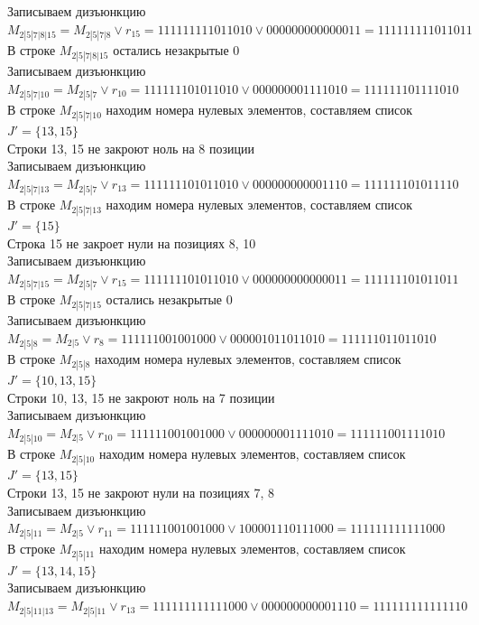 \documentclass[12pt,a4paper]{report}
\begin{document}
Записываем дизъюнкцию $M_{2 | 5 | 7 | 8 | 15} = M_{2 | 5 | 7 | 8}\vee r_{15} = 111111111011010 \vee 000000000000011 = 111111111011011$ \\
В строке $M_{2 | 5 | 7 | 8 | 15}$ остались незакрытые $0$ \\
Записываем дизъюнкцию $M_{2 | 5 | 7 | 10} = M_{2 | 5 | 7}\vee r_{10} = 111111101011010 \vee 000000001111010 = 111111101111010$ \\
В строке $M_{2 | 5 | 7 | 10}$ находим номера нулевых элементов, составляем список $J' = \{13, 15\}$ \\
Строки 13, 15 не закроют ноль на 8 позиции \\
Записываем дизъюнкцию $M_{2 | 5 | 7 | 13} = M_{2 | 5 | 7}\vee r_{13} = 111111101011010 \vee 000000000001110 = 111111101011110$ \\
В строке $M_{2 | 5 | 7 | 13}$ находим номера нулевых элементов, составляем список $J' = \{15\}$ \\
Строка 15 не закроет нули на позициях 8, 10 \\
Записываем дизъюнкцию $M_{2 | 5 | 7 | 15} = M_{2 | 5 | 7}\vee r_{15} = 111111101011010 \vee 000000000000011 = 111111101011011$ \\
В строке $M_{2 | 5 | 7 | 15}$ остались незакрытые $0$ \\
Записываем дизъюнкцию $M_{2 | 5 | 8} = M_{2 | 5}\vee r_{8} = 111111001001000 \vee 000001011011010 = 111111011011010$ \\
В строке $M_{2 | 5 | 8}$ находим номера нулевых элементов, составляем список $J' = \{10, 13, 15\}$ \\
Строки 10, 13, 15 не закроют ноль на 7 позиции \\
Записываем дизъюнкцию $M_{2 | 5 | 10} = M_{2 | 5}\vee r_{10} = 111111001001000 \vee 000000001111010 = 111111001111010$ \\
В строке $M_{2 | 5 | 10}$ находим номера нулевых элементов, составляем список $J' = \{13, 15\}$ \\
Строки 13, 15 не закроют нули на позициях 7, 8 \\
Записываем дизъюнкцию $M_{2 | 5 | 11} = M_{2 | 5}\vee r_{11} = 111111001001000 \vee 100001110111000 = 111111111111000$ \\
В строке $M_{2 | 5 | 11}$ находим номера нулевых элементов, составляем список $J' = \{13, 14, 15\}$ \\
Записываем дизъюнкцию $M_{2 | 5 | 11 | 13} = M_{2 | 5 | 11}\vee r_{13} = 111111111111000 \vee 000000000001110 = 111111111111110$ \\
\end{document}
